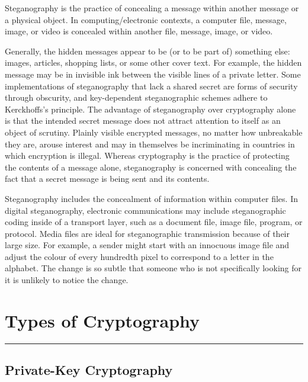 \documentclass[british]{article}
\begin{document}
Steganography is the practice of concealing a message within another
message or a physical object. In computing/electronic contexts, a
computer file, message, image, or video is concealed within another
file, message, image, or video.

Generally, the hidden messages appear to be (or to be part of) something
else: images, articles, shopping lists, or some other cover text.
For example, the hidden message may be in invisible ink between the
visible lines of a private letter. Some implementations of steganography
that lack a shared secret are forms of security through obscurity,
and key-dependent steganographic schemes adhere to Kerckhoffs's principle.
The advantage of steganography over cryptography alone is that the
intended secret message does not attract attention to itself as an
object of scrutiny. Plainly visible encrypted messages, no matter
how unbreakable they are, arouse interest and may in themselves be
incriminating in countries in which encryption is illegal. Whereas
cryptography is the practice of protecting the contents of a message
alone, steganography is concerned with concealing the fact that a
secret message is being sent and its contents.

Steganography includes the concealment of information within computer
files. In digital steganography, electronic communications may include
steganographic coding inside of a transport layer, such as a document
file, image file, program, or protocol. Media files are ideal for
steganographic transmission because of their large size. For example,
a sender might start with an innocuous image file and adjust the colour
of every hundredth pixel to correspond to a letter in the alphabet.
The change is so subtle that someone who is not specifically looking
for it is unlikely to notice the change.

\vfill{}

\pagebreak{}

\section{Types of Cryptography}
\begin{center}
	\rule[0.5ex]{450bp}{0.75pt}
	\par\end{center}

\subsection{Private-Key Cryptography}
\end{document}
